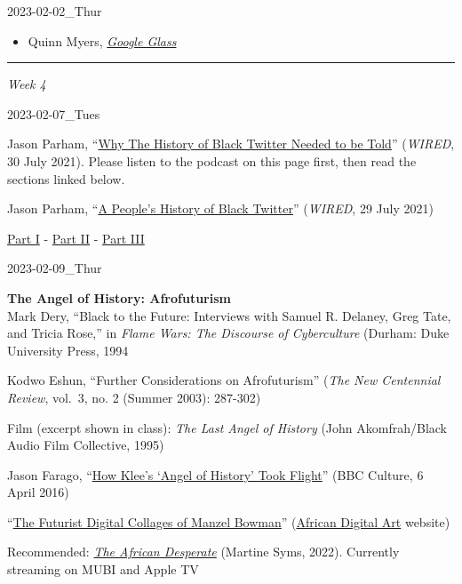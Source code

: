 \documentclass[
  letterpaper,
  DIV=11,
  numbers=noendperiod]{scrartcl}
\providecommand{\tightlist}{%
  \setlength{\itemsep}{0pt}\setlength{\parskip}{0pt}}\usepackage{longtable,booktabs,array}
\begin{document}
2023-02-02\_Thur

\begin{itemize}
\tightlist
\item
  Quinn Myers,
  \href{http://www.instarbooks.com/books/google-glass.html}{\emph{Google
  Glass}}
\end{itemize}

\begin{center}\rule{0.5\linewidth}{0.5pt}\end{center}

\emph{Week 4}

2023-02-07\_Tues

Jason Parham,
``\href{https://www.wired.com/story/gadget-lab-podcast-514/}{Why The
History of Black Twitter Needed to be Told}'' (\emph{WIRED}, 30 July
2021). Please listen to the podcast on this page first, then read the
sections linked below.

Jason Parham,
``\href{https://www.wired.com/story/black-twitter-oral-history-part-i-coming-together/}{A
People's History of Black Twitter}'' (\emph{WIRED}, 29 July 2021)

\href{pdf/black-twitter1.pdf}{Part I} -
\href{pdf/blacktwitter2.pdf}{Part II} -
\href{pdf/black-twitter3.pdf}{Part III}~

2023-02-09\_Thur

\textbf{The Angel of History: Afrofuturism}\\
Mark Dery, ``Black to the Future: Interviews with Samuel R. Delaney,
Greg Tate, and Tricia Rose,'' in \emph{Flame Wars: The Discourse of
Cyberculture} (Durham: Duke University Press, 1994

Kodwo Eshun, ``Further Considerations on Afrofuturism'' (\emph{The New
Centennial Review}, vol.~3, no. 2 (Summer 2003): 287-302)

Film (excerpt shown in class): \emph{The Last Angel of History} (John
Akomfrah/Black Audio Film Collective, 1995)

Jason Farago,
``\href{https://www.bbc.com/culture/article/20160401-how-klees-angel-of-history-took-flight}{How
Klee's `Angel of History' Took Flight}'' (BBC Culture, 6 April 2016)

``\href{http://www.africandigitalart.com/2017/10/05/the-futurist-digital-collages-by-manzel-bowman/}{The
Futurist Digital Collages of Manzel Bowman}''
(\href{http://africandigitalart.com/}{African Digital Art} website)

Recommended:
\href{https://mubi.com/films/the-african-desperate}{\emph{The African
Desperate}} (Martine Syms, 2022). Currently streaming on MUBI and Apple
TV
\end{document}
